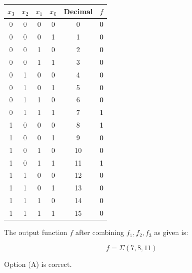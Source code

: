 \documentclass[12pt,a4paper]{article}
\begin{document}
\begin{tabular}{|c|c|c|c|c|c|}
\hline
\(x_3\) & \(x_2\) & \(x_1\) & \(x_0\) & Decimal & \(f\) \\
\hline
0 & 0 & 0 & 0 & 0 & 0 \\
0 & 0 & 0 & 1 & 1 & 0 \\
0 & 0 & 1 & 0 & 2 & 0 \\
0 & 0 & 1 & 1 & 3 & 0 \\
0 & 1 & 0 & 0 & 4 & 0 \\
0 & 1 & 0 & 1 & 5 & 0 \\
0 & 1 & 1 & 0 & 6 & 0 \\
0 & 1 & 1 & 1 & 7 & 1 \\
1 & 0 & 0 & 0 & 8 & 1 \\
1 & 0 & 0 & 1 & 9 & 0 \\
1 & 0 & 1 & 0 & 10 & 0 \\
1 & 0 & 1 & 1 & 11 & 1 \\
1 & 1 & 0 & 0 & 12 & 0 \\
1 & 1 & 0 & 1 & 13 & 0 \\
1 & 1 & 1 & 0 & 14 & 0 \\
1 & 1 & 1 & 1 & 15 & 0 \\
\hline
\end{tabular}

The output function \( f \) after combining \( f_1, f_2, f_3 \) as given is:

\[
f = \Sigma(7, 8, 11)
\]

Option (A) is correct.
\end{document}

